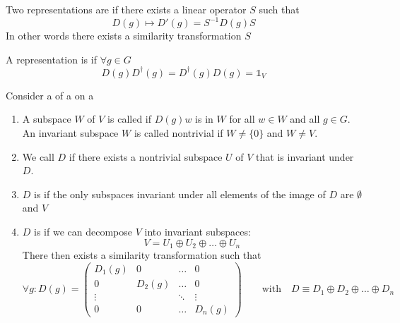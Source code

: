 \begin{definition}
Two representations are  if there exists a linear operator $S$ such that
\[D(g) \mapsto D'(g) = S^{-1}D(g)S\]
In other words there exists a similarity transformation $S$
\end{definition}

\begin{definition}
A representation is  if $\forall g \in G$
\[D(g)D^\dagger(g) = D^\dagger(g)D(g) = \mathbb{1}_V\]
\end{definition}

\begin{definition}
Consider a  of a  on a 
\begin{enumerate}
\item A subspace $W$ of $V$ is called  if $D(g)w$ is in $W$ for all $w \in W$ and all $g \in G$. An invariant subspace $W$ is called nontrivial if $W\neq\{0\}$ and $W \neq V$.
\item We call $D$  if there exists a nontrivial subspace $U$ of $V$ that is invariant under $D$.
\item $D$ is  if the only subspaces invariant under all elements of the image of $D$ are $\emptyset$ and $V$
\item $D$ is  if we can decompose $V$ into invariant subspaces:
\[V = U_1\oplus U_2 \oplus \ldots \oplus U_n\]
There then exists a similarity transformation such that
\[\forall g: D(g) = \begin{pmatrix}
D_1(g) & 0 & \dots & 0\\
0 & D_2(g)  & \dots & 0\\
\vdots & & \ddots & \vdots\\
0&0&\dots&D_n(g)
\end{pmatrix}\qquad \text{with}\quad D \equiv D_1\oplus D_2 \oplus \ldots \oplus D_n\]
\end{enumerate}
\end{definition}

